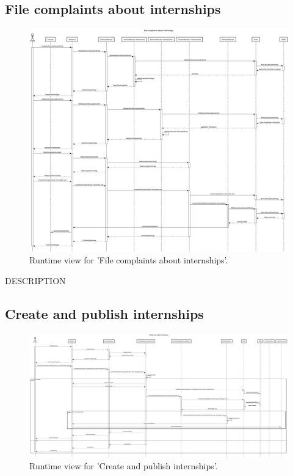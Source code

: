 \subsection{File complaints about internships}
\begin{figure}[H]
    \begin{center}
        \includegraphics[width=0.8\linewidth]{DD/LaTeX/Images/RuntimeView/FileComplaintsAboutInternships.png}
        \caption{Runtime view for 'File complaints about internships'.}
        \label{fig:runtime_FileComplaintsAboutInternships}%
    \end{center}
\end{figure}

DESCRIPTION


\subsection{Create and publish internships}
\begin{figure}[H]
    \begin{center}
        \includegraphics[width=0.8\linewidth]{DD/LaTeX/Images/RuntimeView/PublishInternship.png}
        \caption{Runtime view for 'Create and publish internships'.}
        \label{fig:runtime_PublishInternship}%
    \end{center}
\end{figure}

